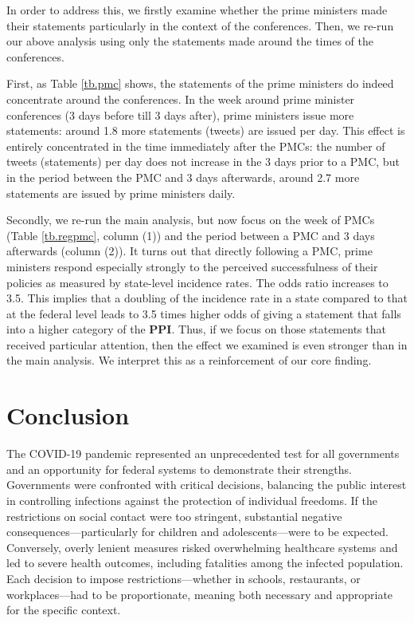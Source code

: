 \documentclass[12pt, abstract=true]{scrartcl}
\begin{document}


In order to address this, we firstly examine whether the prime ministers made their statements particularly in the context of the conferences. Then, we re-run our above analysis using only the statements made around the times of the conferences.

First, as Table \ref{tb.pmc} shows, the statements of the prime ministers do indeed concentrate around the conferences. In the week around prime minister conferences (3 days before till 3 days after), prime ministers issue more statements: around 1.8 more statements (tweets) are issued per day. This effect is entirely concentrated in the time immediately after the PMCs: the number of tweets (statements) per day does not increase in the 3 days prior to a PMC, but in the period between the PMC and 3 days afterwards, around 2.7 more statements are issued by prime ministers daily.



Secondly, we re-run the main analysis, but now focus on the week of PMCs (Table \ref{tb.regpmc}, column (1)) and the period between a PMC and 3 days afterwards (column (2)). It turns out that directly following a PMC, prime ministers respond especially strongly to the perceived successfulness of their policies as measured by state-level incidence rates. The odds ratio increases to 3.5. This implies that a doubling of the incidence rate in a state compared to that at the federal level leads to 3.5 times higher odds of giving a statement that falls into a higher category of the \textbf{PPI}. Thus, if we focus on those statements that received particular attention, then the effect we examined is even stronger than in the main analysis. We interpret this as a reinforcement of our core finding.

\section{Conclusion}\label{sec.conclusion}
The COVID-19 pandemic represented an unprecedented test for all governments and an opportunity for federal systems to demonstrate their strengths. Governments were confronted with critical decisions, balancing the public interest in controlling infections against the protection of individual freedoms. If the restrictions on social contact were too stringent, substantial negative consequences---particularly for children and adolescents---were to be expected. Conversely, overly lenient measures risked overwhelming healthcare systems and led to severe health outcomes, including fatalities among the infected population. Each decision to impose restrictions—whether in schools, restaurants, or workplaces—had to be proportionate, meaning both necessary and appropriate for the specific context.
\end{document}
